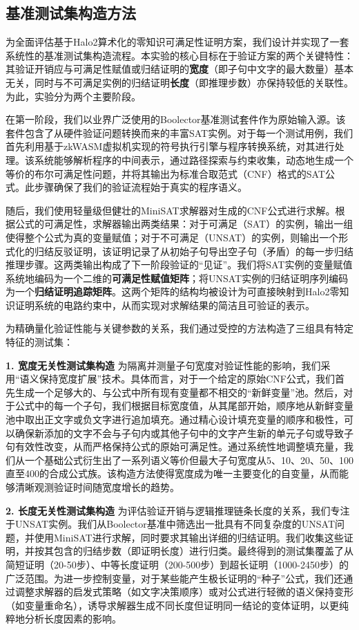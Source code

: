 \subsection{基准测试集构造方法}

为全面评估基于Halo2算术化的零知识可满足性证明方案，我们设计并实现了一套系统性的基准测试集构造流程。本实验的核心目标在于验证方案的两个关键特性：其验证开销应与可满足性赋值或归结证明的\textbf{宽度}（即子句中文字的最大数量）基本无关，同时与不可满足实例的归结证明\textbf{长度}（即推理步数）亦保持较低的关联性。为此，实验分为两个主要阶段。

在第一阶段，我们以业界广泛使用的Boolector基准测试套件作为原始输入源。该套件包含了从硬件验证问题转换而来的丰富SAT实例。对于每一个测试用例，我们首先利用基于zkWASM虚拟机实现的符号执行引擎与程序转换系统，对其进行处理。该系统能够解析程序的中间表示，通过路径探索与约束收集，动态地生成一个等价的布尔可满足性问题，并将其输出为标准合取范式（CNF）格式的SAT公式。此步骤确保了我们的验证流程始于真实的程序语义。

随后，我们使用轻量级但健壮的MiniSAT求解器对生成的CNF公式进行求解。根据公式的可满足性，求解器输出两类结果：对于可满足（SAT）的实例，输出一组使得整个公式为真的变量赋值；对于不可满足（UNSAT）的实例，则输出一个形式化的归结反驳证明，该证明记录了从初始子句导出空子句（矛盾）的每一步归结推理步骤。这两类输出构成了下一阶段验证的“见证”。我们将SAT实例的变量赋值系统地编码为一个二维的\textbf{可满足性赋值矩阵}；将UNSAT实例的归结证明序列编码为一个\textbf{归结证明追踪矩阵}。这两个矩阵的结构均被设计为可直接映射到Halo2零知识证明系统的电路约束中，从而实现对求解结果的简洁且可验证的表示。

为精确量化验证性能与关键参数的关系，我们通过受控的方法构造了三组具有特定特征的测试集：

\textbf{1. 宽度无关性测试集构造}
为隔离并测量子句宽度对验证性能的影响，我们采用“语义保持宽度扩展”技术。具体而言，对于一个给定的原始CNF公式，我们首先生成一个足够大的、与公式中所有现有变量都不相交的“新鲜变量”池。然后，对于公式中的每一个子句，我们根据目标宽度值，从其尾部开始，顺序地从新鲜变量池中取出正文字或负文字进行追加填充。通过精心设计填充变量的顺序和极性，可以确保新添加的文字不会与子句内或其他子句中的文字产生新的单元子句或导致子句有效性改变，从而严格保持公式的原始可满足性。通过系统性地调整填充量，我们从一个基础公式衍生出了一系列语义等价但最大子句宽度从5、10、20、50、100直至400的合成公式族。该构造方法使得宽度成为唯一主要变化的自变量，从而能够清晰观测验证时间随宽度增长的趋势。

\textbf{2. 长度无关性测试集构造}
为评估验证开销与逻辑推理链条长度的关系，我们专注于UNSAT实例。我们从Boolector基准中筛选出一批具有不同复杂度的UNSAT问题，并使用MiniSAT进行求解，同时要求其输出详细的归结证明。我们收集这些证明，并按其包含的归结步数（即证明长度）进行归类。最终得到的测试集覆盖了从简短证明（20-50步）、中等长度证明（200-500步）到超长证明（1000-2450步）的广泛范围。为进一步控制变量，对于某些能产生极长证明的“种子”公式，我们还通过调整求解器的启发式策略（如文字决策顺序）或对公式进行轻微的语义保持变形（如变量重命名），诱导求解器生成不同长度但证明同一结论的变体证明，以更纯粹地分析长度因素的影响。

